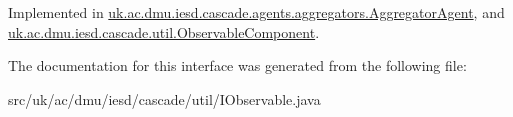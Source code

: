 Implemented in \hyperlink{classuk_1_1ac_1_1dmu_1_1iesd_1_1cascade_1_1agents_1_1aggregators_1_1_aggregator_agent_af1d3c6ccad69e49e95aa9393af89d8af}{uk.\-ac.\-dmu.\-iesd.\-cascade.\-agents.\-aggregators.\-Aggregator\-Agent}, and \hyperlink{classuk_1_1ac_1_1dmu_1_1iesd_1_1cascade_1_1util_1_1_observable_component_a2de999ded542075a4074e1e3afaf50ba}{uk.\-ac.\-dmu.\-iesd.\-cascade.\-util.\-Observable\-Component}.



The documentation for this interface was generated from the following file\-:\begin{DoxyCompactItemize}
\item 
src/uk/ac/dmu/iesd/cascade/util/I\-Observable.\-java\end{DoxyCompactItemize}
